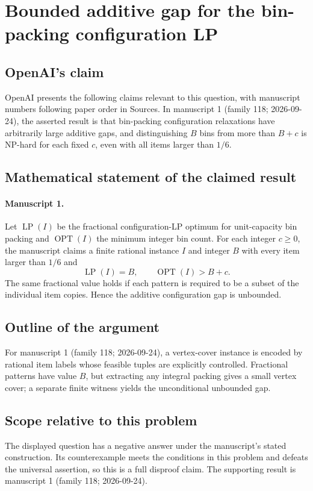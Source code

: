 \documentclass[11pt]{article}
\begin{document}
\section*{Bounded additive gap for the bin-packing configuration LP}

\subsection{OpenAI's claim}
OpenAI presents the following claims relevant to this question, with manuscript numbers following paper order in Sources. In manuscript 1 (family 118; 2026-09-24), the asserted result is that bin-packing configuration relaxations have arbitrarily large additive gaps, and distinguishing $B$ bins from more than $B+c$ is NP-hard for each fixed $c$, even with all items larger than $1/6$.

\subsection{Mathematical statement of the claimed result}
\paragraph{Manuscript 1.}
Let $\operatorname{LP}(I)$ be the fractional configuration-LP optimum for unit-capacity bin packing and $\operatorname{OPT}(I)$ the minimum integer bin count. For each integer $c\ge0$, the manuscript claims a finite rational instance $I$ and integer $B$ with every item larger than $1/6$ and
\[
 \operatorname{LP}(I)=B,\qquad\operatorname{OPT}(I)>B+c.
\]
The same fractional value holds if each pattern is required to be a subset of the individual item copies. Hence the additive configuration gap is unbounded.

\subsection{Outline of the argument}
For manuscript 1 (family 118; 2026-09-24), a vertex-cover instance is encoded by rational item labels whose feasible tuples are explicitly controlled. Fractional patterns have value $B$, but extracting any integral packing gives a small vertex cover; a separate finite witness yields the unconditional unbounded gap.

\subsection{Scope relative to this problem}
The displayed question has a negative answer under the manuscript's stated construction. Its counterexample meets the conditions in this problem and defeats the universal assertion, so this is a full disproof claim. The supporting result is manuscript 1 (family 118; 2026-09-24).
\end{document}
